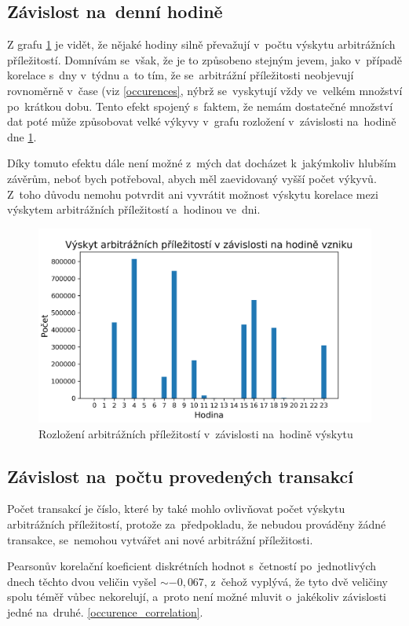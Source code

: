 \documentclass[thesis=B,czech]{FITthesis}[2019/03/21]
\begin{document}
\subsection{Závislost na~denní hodině}
Z grafu \ref{hours_distribution} je vidět, že nějaké hodiny silně převažují v~počtu výskytu arbitrážních příležitostí. Domnívám se~však, že je to způsobeno stejným jevem, jako v~případě korelace s~dny v~týdnu a~to tím, že se~arbitrážní příležitosti neobjevují rovnoměrně v~čase (viz \ref{occurences}, nýbrž se~vyskytují vždy ve~velkém množství po~krátkou dobu. Tento efekt spojený s~faktem, že nemám dostatečné množství dat poté může způsobovat velké výkyvy v~grafu rozložení v~závislosti na~hodině dne \ref{hours_distribution}.

Díky tomuto efektu dále není možné z~mých dat docházet k~jakýmkoliv hlubším závěrům, neboť bych potřeboval, abych měl zaevidovaný vyšší počet výkyvů. Z~toho důvodu nemohu potvrdit ani vyvrátit možnost výskytu korelace mezi výskytem arbitrážních příležitostí a~hodinou ve~dni.

\begin{figure}\centering
	\includegraphics[width=1\textwidth]{images/hours_distribution.png}
	\caption{Rozložení arbitrážních příležitostí v~závislosti na~hodině výskytu }\label{hours_distribution}
\end{figure}
\subsection{Závislost na~počtu provedených transakcí}
Počet transakcí je číslo, které by také mohlo ovlivňovat počet výskytu arbitrážních příležitostí, protože za~předpokladu, že nebudou prováděny žádné transakce, se~nemohou vytvářet ani nové arbitrážní příležitosti.

Pearsonův korelační koeficient diskrétních hodnot s~četností po~jednotlivých dnech těchto dvou veličin vyšel \(\sim-0,067\), z~čehož vyplývá, že tyto dvě veličiny spolu téměř vůbec nekorelují, a~proto není možné mluvit o~jakékoliv závislosti jedné na~druhé. \ref{occurence_correlation}.
\end{document}
